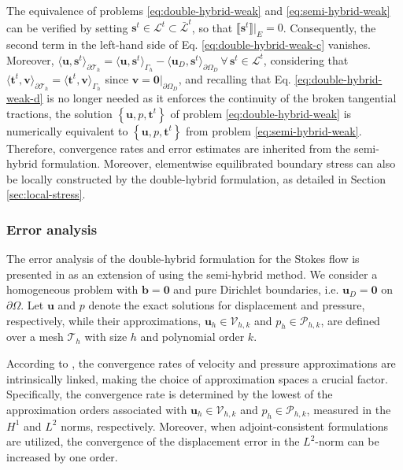 \documentclass[english,11pt,3p,number,sort&compress]{elsarticle}
\newcommand{\jump}[1]
{
	\llbracket #1 \rrbracket
}
\begin{document}
The equivalence of problems \eqref{eq:double-hybrid-weak} and \eqref{eq:semi-hybrid-weak} can be verified by setting $\bm{s}^t \in \mathcal{L}^t \subset \bar{\mathcal{L}}^t$, so that $\jump{\bm{s}^t}\lvert_E=0$. Consequently, the second term in the left-hand side of Eq. \eqref{eq:double-hybrid-weak-c} vanishes. Moreover, $\langle\bm{u},\bm{s}^t\rangle_{\partial\mathcal{T}_h}=\langle\bm{u},\bm{s}^t\rangle_{\Gamma_h}-\langle\bm{u}_D,\bm{s}^t\rangle_{\partial\Omega_D} \, \forall \, \bm{s}^t \in \mathcal{L}^t$, considering that $\langle\bm{t}^t,\bm{v}\rangle_{\partial\mathcal{T}_h} = \langle\bm{t}^t,\bm{v}\rangle_{\Gamma_h}$ since $\bm{v}=\bm{0}\lvert_{\partial\Omega_D}$, and recalling that Eq. \eqref{eq:double-hybrid-weak-d} is no longer needed as it enforces the continuity of the broken tangential tractions, the solution $\left\{\bm{u},p,\bm{t}^t \right\}$ of problem \eqref{eq:double-hybrid-weak} is numerically equivalent to $\left\{\bm{u},p,\bm{t}^t \right\}$ from problem \eqref{eq:semi-hybrid-weak}. Therefore, convergence rates and error estimates are inherited from the semi-hybrid formulation. Moreover, elementwise equilibrated boundary stress can also be locally constructed by the double-hybrid formulation, as detailed in Section \ref{sec:local-stress}.

\subsubsection{Error analysis}

The error analysis of the double-hybrid formulation for the Stokes flow is presented in \cite{puga2025stable} as an extension of \cite{carvalho2024semi} using the semi-hybrid method. We consider a homogeneous problem with $\bm{b}=\bm{0}$ and pure Dirichlet boundaries, i.e. $\bm{u}_D=\bm{0}$ on $\partial\Omega$. Let $\bm{u}$ and $p$ denote the exact solutions for displacement and pressure, respectively, while their approximations, $\bm{u}_h \in \mathcal{V}_{h,k}$ and $p_h \in \mathcal{P}_{h,k}$, are defined over a mesh $\mathcal{T}_h$ with size $h$ and polynomial order $k$.

According to \cite{brezzi2005mixed}, the convergence rates of velocity and pressure approximations are intrinsically linked, making the choice of approximation spaces a crucial factor. Specifically, the convergence rate is determined by the lowest of the approximation orders associated with $\bm{u}_h \in \mathcal{V}_{h,k}$ and $p_h \in \mathcal{P}_{h,k}$, measured in the $H^1$ and $L^2$ norms, respectively. Moreover, when adjoint-consistent formulations are utilized, the convergence of the displacement error in the $L^2$-norm can be increased by one order.
\end{document}
